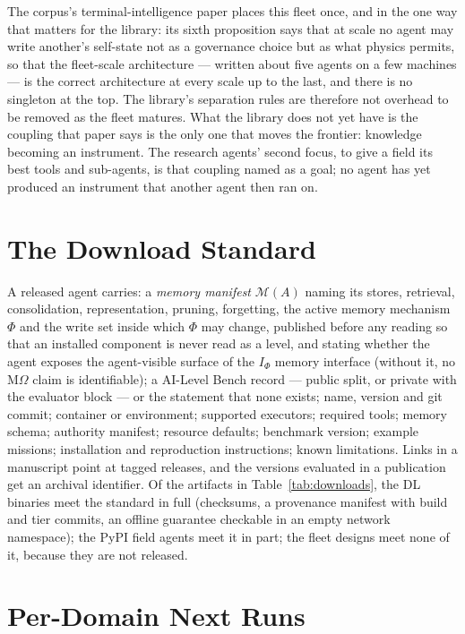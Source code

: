 The corpus's terminal-intelligence paper places this fleet once, and in the one way that matters for the library: its sixth proposition says that at scale no agent may write another's self-state not as a governance choice but as what physics permits, so that the fleet-scale architecture --- written about five agents on a few machines --- is the correct architecture at every scale up to the last, and there is no singleton at the top. The library's separation rules are therefore not overhead to be removed as the fleet matures. What the library does not yet have is the coupling that paper says is the only one that moves the frontier: knowledge becoming an instrument. The research agents' second focus, to give a field its best tools and sub-agents, is that coupling named as a goal; no agent has yet produced an instrument that another agent then ran on.

\section{The Download Standard}\label{sec:standard}

A released agent carries: a \emph{memory manifest} $\mathcal M(A)$ naming its stores, retrieval, consolidation, representation, pruning, forgetting, the active memory mechanism $\Phi$ and the write set inside which $\Phi$ may change, published before any reading so that an installed component is never read as a level, and stating whether the agent exposes the agent-visible surface of the $I_\Phi$ memory interface (without it, no M$\Omega$ claim is identifiable); a AI-Level Bench record --- public split, or private with the evaluator block --- or the statement that none exists; name, version and git commit; container or environment; supported executors; required tools; memory schema; authority manifest; resource defaults; benchmark version; example missions; installation and reproduction instructions; known limitations. Links in a manuscript point at tagged releases, and the versions evaluated in a publication get an archival identifier. Of the artifacts in Table~\ref{tab:downloads}, the DL binaries meet the standard in full (checksums, a provenance manifest with build and tier commits, an offline guarantee checkable in an empty network namespace); the PyPI field agents meet it in part; the fleet designs meet none of it, because they are not released.

\section{Per-Domain Next Runs}\label{sec:next}

